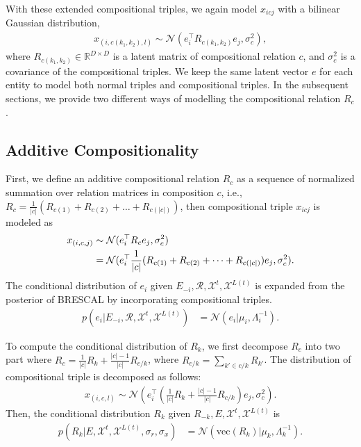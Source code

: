 With these extended compositional triples, we again model $x_{icj}$ with a bilinear Gaussian distribution,
\begin{align}
x_{(i, {{c}(k_1, k_2)}, l)} \sim \mathcal{N}(e_i^\top R_{{c}(k_1,k_2)} e_j, \sigma_{c}^2),
\end{align}
where $R_{{c}(k_1,k_2)} \in \mathbb{R}^{D\times D}$ is a latent matrix of compositional relation $c$, and $
\sigma_{c}^2$ is a covariance of the compositional triples. We keep the same latent vector $e$ for each entity
to model both normal triples and compositional triples.
In the subsequent sections, we provide two different ways of modelling the compositional relation $R_c$.

\subsection{Additive Compositionality}
First, we define an additive compositional relation $R_c$ as a sequence of normalized summation over
relation matrices in composition $c$, i.e.,
$R_{{c}} = \frac{1}{|c|}(R_{c(1)} + R_{c(2)} + \dots + R_{c(|c|)})$, then compositional triple $x_{icj}$
is modeled as
\begin{align}
x_{(i, c, j)} &\sim \mathcal{N}(e_i^\top R_c e_j, \sigma_{c}^2) \\
&= \mathcal{N}(e_i^\top \frac{1}{|c|}(R_{c(1)} + R_{c(2)} + \dots + R_{c(|c|)}) e_j, \sigma_{c}^2). \notag
\end{align}
The conditional distribution of $e_i$ given $E_{-i}, \mathcal{R}, \mathcal{X}^{t}, \mathcal{X}^{L(t)}$ is
expanded from the posterior of BRESCAL by incorporating compositional triples.
\begin{align} \label{eqn:comp_sample_e}
p(e_i |E_{-i}, \mathcal{R}, \mathcal{X}^{t}, \mathcal{X}^{L(t)}) &= \mathcal{N}(e_i | \mu_i, \Lambda_i^{-1}).
\end{align}

To compute the conditional distribution of $R_k$, we first decompose $R_c$ into two part where $R_c =
\frac{1}{|c|} R_k + \frac{|c|-1}{|c|}R_{c/k}$, where $R_{c/k} = \sum_{k' \in c/k} R_{k'}$.
The distribution of compositional triple is decomposed as follows:
\begin{align}
x_{(i, c, l)} \sim \mathcal{N}(e_i^\top (\frac{1}{|c|} R_k + \frac{|c|-1}{|c|}R_{c/k}) e_j, \sigma_{c}^2).
\end{align}
Then, the conditional distribution $R_k$ given $R_{-k}, E, \mathcal{X}^{t}, \mathcal{X}^{L(t)}$ is
\begin{align}
\label{eqn:comp_cond_r}
p(R_k|E, \mathcal{X}^{t}, \mathcal{X}^{L(t)}, \sigma_r, \sigma_x)  &= \mathcal{N}(\text{vec}(R_k) | \mu_k,
\Lambda_k^{-1}).
\end{align}

